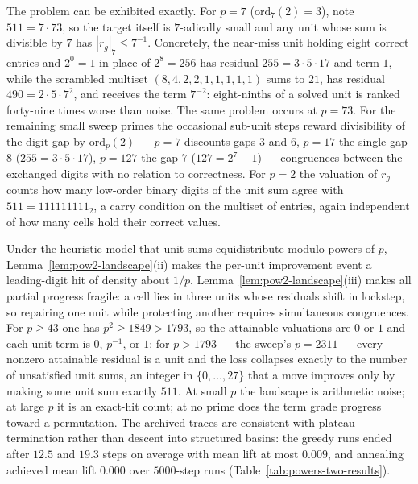 \documentclass[11pt]{article}
\begin{document}
The problem can be exhibited exactly. For $p = 7$
($\mathrm{ord}_7(2) = 3$), note $511 = 7 \cdot 73$, so the target itself is
$7$-adically small and any unit whose sum is divisible by $7$ has
$|r_g|_7 \le 7^{-1}$. Concretely, the near-miss unit holding eight correct
entries and $2^{0}=1$ in place of $2^{8}=256$ has residual
$255 = 3\cdot 5\cdot 17$ and term $1$, while the scrambled multiset
$(8,4,2,2,1,1,1,1,1)$ sums to $21$, has residual $490 = 2\cdot 5\cdot 7^{2}$,
and receives the term $7^{-2}$: eight-ninths of a solved unit is ranked
forty-nine times worse than noise. The same problem occurs at $p = 73$.
For the remaining small sweep primes the occasional sub-unit steps reward
divisibility of the digit gap by $\mathrm{ord}_p(2)$ --- $p=7$ discounts
gaps $3$ and $6$, $p=17$ the single gap $8$ ($255 = 3\cdot 5\cdot 17$),
$p=127$ the gap $7$ ($127 = 2^{7}-1$) --- congruences between the exchanged
digits with no relation to correctness. For $p=2$ the valuation of $r_g$
counts how many low-order binary digits of the
unit sum agree with $511 = 111111111_2$, a carry condition on the multiset
of entries, again independent of how many cells hold their correct values.

Under the heuristic model that unit sums equidistribute modulo powers of $p$,
Lemma~\ref{lem:pow2-landscape}(ii) makes the per-unit improvement event a
leading-digit hit of density about $1/p$. Lemma~\ref{lem:pow2-landscape}(iii)
makes all partial progress fragile: a cell lies in three units
whose residuals shift in lockstep, so repairing one unit while protecting
another requires simultaneous congruences. For $p \ge 43$ one has
$p^{2} \ge 1849 > 1793$, so the attainable valuations are $0$ or $1$ and
each unit term is $0$, $p^{-1}$, or $1$; for $p > 1793$ --- the sweep's
$p = 2311$ --- every nonzero attainable residual is a unit and the loss
collapses exactly to the number of unsatisfied unit sums, an integer in
$\{0,\dots,27\}$ that a move improves only by making some unit sum exactly
$511$. At small $p$ the landscape is arithmetic noise; at large $p$ it is
an exact-hit count; at no prime does the term grade progress toward a
permutation. The archived traces are consistent with plateau termination
rather than descent into structured basins: the greedy runs ended after
$12.5$ and $19.3$ steps on average with mean lift at most $0.009$, and
annealing achieved mean lift $0.000$ over $5000$-step runs
(Table~\ref{tab:powers-two-results}).
\end{document}
